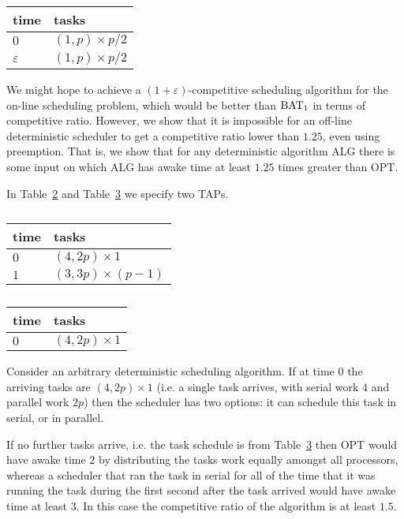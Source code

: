 \begin{table}[H]
\caption{}
\label{tab:2minusEps}
\centering
\begin{tabular}{|l|l|}
\hline
time & tasks                    \\ \hline
$0$  & $(1,p) \times p/2$       \\ \hline
$\varepsilon$  & $(1, p) \times p/2$ \\ \hline
\end{tabular}
\end{table}

We might hope to achieve a $(1+\varepsilon)$-competitive scheduling
algorithm for the on-line scheduling problem, which would be
better than $\operatorname{\text{BAT}}_1$ in terms of competitive ratio. However, we
show that it is impossible for an off-line deterministic
scheduler to get a competitive ratio lower than $1.25$, even
using preemption. That is, we show that for any deterministic
algorithm ALG there is some input on which ALG has awake time at
least $1.25$ times greater than OPT. 

In Table~\ref{tab:lowerboundFork1} and
Table~\ref{tab:lowerboundFork2} we specify two TAPs.

\begin{table}[H]
\caption{}
\label{tab:lowerboundFork1}
\centering
\begin{tabular}{|l|l|}
\hline
time & tasks                    \\ \hline
$0$  & $(4, 2p) \times 1$       \\ \hline
$1$  & $(3, 3p) \times (p-1)$ \\ \hline
\end{tabular}
\end{table}

\begin{table}[H]
\caption{}
\label{tab:lowerboundFork2}
\centering
\begin{tabular}{|l|l|}
\hline
time & tasks                    \\ \hline
$0$  & $(4, 2p) \times 1$       \\ \hline
\end{tabular}
\end{table}

Consider an arbitrary deterministic scheduling algorithm. If at
time $0$ the arriving tasks are $(4, 2p)\times 1$ (i.e. a single
task arrives, with serial work $4$ and parallel work $2p$) then
the scheduler has two options: it can schedule this task in
serial, or in parallel.

If no further tasks arrive, i.e. the task schedule is from
Table~\ref{tab:lowerboundFork2} then OPT would have awake time
$2$ by distributing the tasks work equally amongst all
processors, whereas a scheduler that ran the task in serial for
all of the time that it was running the task during the first
second after the task arrived would have awake time at least $3$.
In this case the competitive ratio of the algorithm is at least $1.5$.

